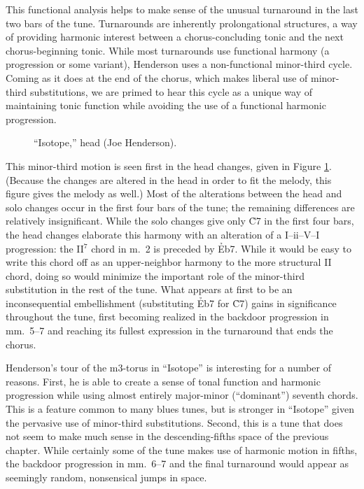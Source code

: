 This functional analysis helps to make sense of the unusual turnaround in the
last two bars of the tune. Turnarounds are inherently prolongational
structures, a way of providing harmonic interest between a chorus-concluding
tonic and the next chorus-beginning tonic. While most turnarounds
use functional harmony (a \tfo progression or some variant), Henderson uses a
non-functional minor-third cycle. Coming as it does at the end of the chorus,
which makes liberal use of minor-third substitutions, we are primed to hear
this cycle as a unique way of maintaining tonic function while avoiding the use
of a functional harmonic progression.

\begin{figure}[tbp]
  \caption{``Isotope,'' head (Joe Henderson).}
  \label{mts:isotope-head}
\end{figure}

This minor-third motion is seen first in the head changes, given in Figure
\ref{mts:isotope-head}. (Because the changes are altered in the head in order
to fit the melody, this figure gives the melody as well.) Most of the
alterations between the head and solo changes occur in the first four bars of
the tune; the remaining differences are relatively insignificant.
While the solo changes give only \h{C7} in the first four bars, the head
changes elaborate this harmony with an alteration of a I--ii--V--I
progression: the II$^7$ chord in m.~2 is preceded by \h{Eb7}. While it would
be easy to write this chord off as an upper-neighbor harmony to the more
structural II chord, doing so would minimize the important role of the
minor-third substitution in the rest of the tune. What appears at first to be
an inconsequential embellishment (substituting \h{Eb7} for \h{C7}) gains in
significance throughout the tune, first becoming realized in the backdoor
progression in mm.~5--7 and reaching its fullest expression in the turnaround
that ends the chorus.

Henderson's tour of the m3-torus in ``Isotope'' is interesting for a number of
reasons. First, he is able to create a sense of tonal function and harmonic
progression while using almost entirely major-minor (``dominant'') seventh chords. This
is a feature common to many blues tunes, but is stronger in ``Isotope'' given
the pervasive use of minor-third substitutions. Second, this is a tune that
does not seem to make much sense in the descending-fifths \tf space of the
previous chapter. While certainly some of the tune makes use of harmonic
motion in fifths, the backdoor progression in mm.~6--7 and the final
turnaround would appear as seemingly random, nonsensical jumps in \tf space.

